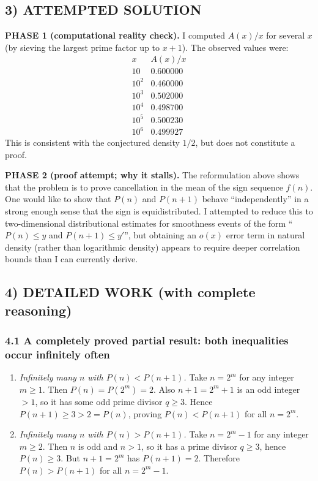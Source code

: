 \subsection*{3) ATTEMPTED SOLUTION}
\textbf{PHASE 1 (computational reality check).} I computed $A(x)/x$ for several $x$ (by sieving the largest prime factor up to $x+1$). The observed values were:
\[
\begin{array}{c|c}
 x & A(x)/x \\\hline
 10 & 0.600000 \\
 10^2 & 0.460000 \\
 10^3 & 0.502000 \\
 10^4 & 0.498700 \\
 10^5 & 0.500230 \\
 10^6 & 0.499927
\end{array}
\]
This is consistent with the conjectured density $1/2$, but does not constitute a proof.

\medskip
\textbf{PHASE 2 (proof attempt; why it stalls).} The reformulation above shows that the problem is to prove cancellation in the mean of the sign sequence $f(n)$. One would like to show that $P(n)$ and $P(n+1)$ behave ``independently'' in a strong enough sense that the sign is equidistributed. I attempted to reduce this to two-dimensional distributional estimates for smoothness events of the form ``$P(n)\le y$ and $P(n+1)\le y'$'', but obtaining an $o(x)$ error term in natural density (rather than logarithmic density) appears to require deeper correlation bounds than I can currently derive.

\subsection*{4) DETAILED WORK (with complete reasoning)}
\subsubsection*{4.1 A completely proved partial result: both inequalities occur infinitely often}
\begin{enumerate}[leftmargin=2.5em]
\item \emph{Infinitely many $n$ with $P(n)<P(n+1)$.}
Take $n=2^m$ for any integer $m\ge 1$. Then $P(n)=P(2^m)=2$. Also $n+1=2^m+1$ is an odd integer $>1$, so it has some odd prime divisor $q\ge 3$. Hence $P(n+1)\ge 3>2=P(n)$, proving $P(n)<P(n+1)$ for all $n=2^m$.

\item \emph{Infinitely many $n$ with $P(n)>P(n+1)$.}
Take $n=2^m-1$ for any integer $m\ge 2$. Then $n$ is odd and $n>1$, so it has a prime divisor $q\ge 3$, hence $P(n)\ge 3$. But $n+1=2^m$ has $P(n+1)=2$. Therefore $P(n)>P(n+1)$ for all $n=2^m-1$.
\end{enumerate}

